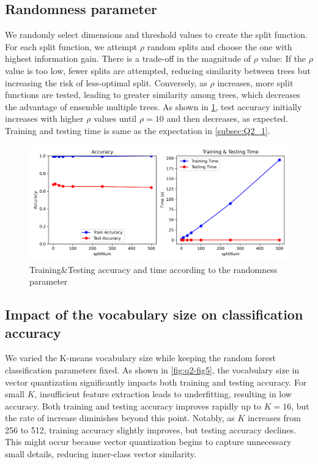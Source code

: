 \subsection{Randomness parameter}
We randomly select dimensions and threshold values to create the split function. For each split function, we attempt $\rho$ random splits and choose the one with highest information gain. There is a trade-off in the magnitude of $\rho$ value: If the $\rho$ value is too low, fewer splits are attempted, reducing similarity between trees but increasing the risk of less-optimal split. Conversely, as $\rho$ increases, more split functions are tested, leading to greater similarity among trees, which decreases the advantage of ensemble multiple trees. As shown in \cref{fig:q2-fig4}, test accuracy initially increases with higher $\rho$ values until $\rho=10$ and then decreases, as expected. Training and testing time is same as the expectation in \cref{subsec:Q2_1}.

\begin{figure}
	\centering
	\includegraphics[width=0.55\linewidth]{image/q2-fig4.png}
	\caption{Training\&Testing accuracy and time according to the randomness parameter}
	\label{fig:q2-fig4}
\end{figure}

\subsection{Impact of the vocabulary size on classification accuracy}
We varied the K-means vocabulary size while keeping the random forest classification parameters fixed. As shown in \cref{fig:q2-fig5}, the vocabulary size in vector quantization significantly impacts both training and testing accuracy. For small $K$, insufficient feature extraction leads to underfitting, resulting in low accuracy. Both training and testing accuracy improves rapidly up to $K=16$, but the rate of increase diminishes beyond this point. Notably, as $K$ increases from 256 to 512, training accuracy slightly improves, but testing accuracy declines. This might occur because vector quantization begins to capture unnecessary small details, reducing inner-class vector similarity.

